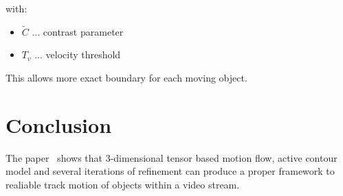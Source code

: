 \documentclass[]{article}
\newcommand{\baseCite}[0]{\cite{kuhne2001tensor}\ }
\begin{document}
with:
	\begin{itemize}[label={}]
		\item $\tilde{C}$ ... contrast parameter
		\item $T_v$ ... velocity threshold
	\end{itemize}

This allows more exact boundary for each moving object.

\section{Conclusion}
\label{sc:conclusio} 

The paper \baseCite shows that 3-dimensional tensor based motion flow, active contour model and several iterations of refinement can produce a proper framework to realiable track motion of objects within a video stream.

\newpage


\end{document}

